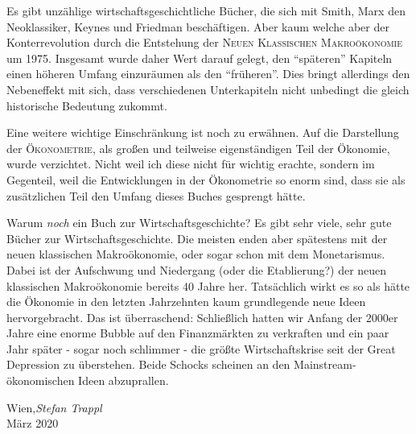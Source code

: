 Es gibt unzählige wirtschaftsgeschichtliche Bücher, die sich mit Smith, Marx den Neoklassiker, Keynes und Friedman beschäftigen. Aber kaum welche aber der Konterrevolution durch die Entstehung der \textsc{Neuen Klassischen Makroökonomie} um 1975. Insgesamt wurde daher Wert darauf gelegt, den "`späteren"' Kapiteln einen höheren Umfang einzuräumen als den "`früheren"'. Dies bringt allerdings den Nebeneffekt mit sich, dass verschiedenen Unterkapiteln nicht unbedingt die gleich historische Bedeutung zukommt.

Eine weitere wichtige Einschränkung ist noch zu erwähnen. Auf die Darstellung der \textsc{Ökonometrie}, als großen und teilweise eigenständigen Teil der Ökonomie, wurde verzichtet. Nicht weil ich diese nicht für wichtig erachte, sondern im Gegenteil, weil die Entwicklungen in der Ökonometrie so enorm sind, dass sie als zusätzlichen Teil den Umfang dieses Buches gesprengt hätte.

Warum \textit{noch} ein Buch zur Wirtschaftsgeschichte? Es gibt sehr viele, sehr gute Bücher zur Wirtschaftsgeschichte. Die meisten enden aber spätestens mit der neuen klassischen Makroökonomie, oder sogar schon mit dem Monetarismus. Dabei ist der Aufschwung und Niedergang (oder die Etablierung?) der neuen klassischen Makroökonomie bereits 40 Jahre her. Tatsächlich wirkt es so als hätte die Ökonomie in den letzten Jahrzehnten kaum grundlegende neue Ideen hervorgebracht. Das ist überraschend: Schließlich hatten wir Anfang der 2000er Jahre eine enorme Bubble auf den Finanzmärkten zu verkraften und ein paar Jahr später - sogar noch schlimmer - die größte Wirtschaftskrise seit der Great Depression zu überstehen. Beide Schocks scheinen an den Mainstream-ökonomischen Ideen abzuprallen.


\vspace{1cm}
\begin{flushright}\noindent
Wien,\hfill {\it Stefan Trappl}\\
März 2020\hfill
\end{flushright}


